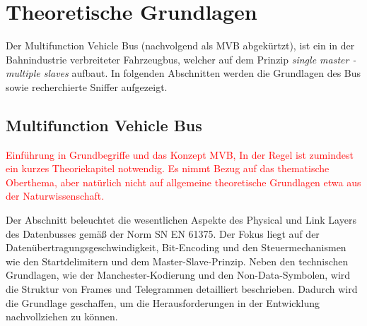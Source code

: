 



\chapter{Theoretische Grundlagen} %
\label{Chapter2TheoretischeGrundlagen} %

Der Multifunction Vehicle Bus (nachvolgend als MVB abgekürtzt), ist ein in der Bahnindustrie verbreiteter Fahrzeugbus, welcher auf dem Prinzip \textit{single master - multiple slaves} aufbaut. In folgenden Abschnitten werden die Grundlagen des Bus sowie recherchierte Sniffer aufgezeigt.


\section{Multifunction Vehicle Bus}

\textcolor{red}{Einführung in Grundbegriffe und das Konzept MVB, In der Regel ist zumindest ein kurzes Theoriekapitel notwendig. Es nimmt Bezug  auf das thematische Oberthema, aber natürlich nicht auf allgemeine theoretische Grundlagen etwa aus der Naturwissenschaft.}

Der Abschnitt beleuchtet die wesentlichen Aspekte des Physical und Link Layers des Datenbusses gemäß der Norm SN EN 61375. Der Fokus liegt auf der Datenübertragungsgeschwindigkeit, Bit-Encoding und den Steuermechanismen wie den Startdelimitern und dem Master-Slave-Prinzip. Neben den technischen Grundlagen, wie der Manchester-Kodierung und den Non-Data-Symbolen, wird die Struktur von Frames und Telegrammen detailliert beschrieben. Dadurch wird die Grundlage geschaffen, um die Herausforderungen in der Entwicklung nachvollziehen zu können.




